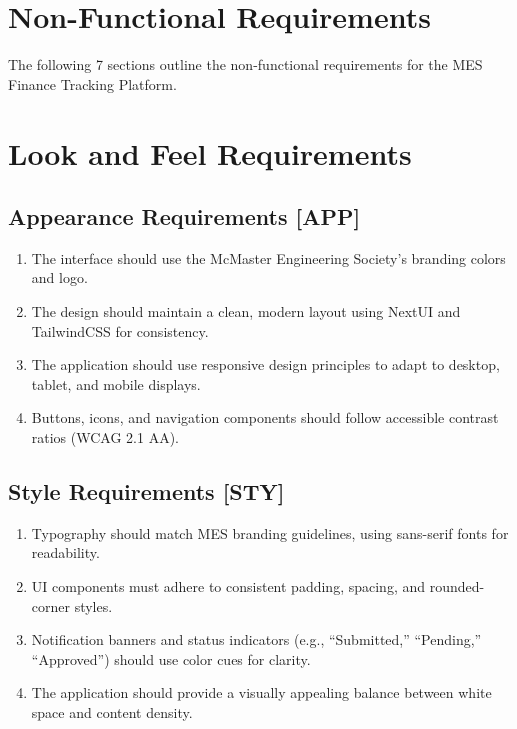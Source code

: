 \documentclass[12pt]{article}
\begin{document}
\section{Non-Functional Requirements}

The following 7 sections outline the non-functional requirements for the MES Finance Tracking Platform.

\section{Look and Feel Requirements}
    \subsection{Appearance Requirements [APP]}
    \begin{enumerate}
        \item The interface should use the McMaster Engineering Society's branding colors and logo.
        \item The design should maintain a clean, modern layout using NextUI and TailwindCSS for consistency.
        \item The application should use responsive design principles to adapt to desktop, tablet, and mobile displays.
        \item Buttons, icons, and navigation components should follow accessible contrast ratios (WCAG 2.1 AA).
    \end{enumerate}

    \subsection{Style Requirements [STY]}
    \begin{enumerate}
        \item Typography should match MES branding guidelines, using sans-serif fonts for readability.
        \item UI components must adhere to consistent padding, spacing, and rounded-corner styles.
        \item Notification banners and status indicators (e.g., “Submitted,” “Pending,” “Approved”) should use color cues for clarity.
        \item The application should provide a visually appealing balance between white space and content density.
    \end{enumerate}
\end{document}
